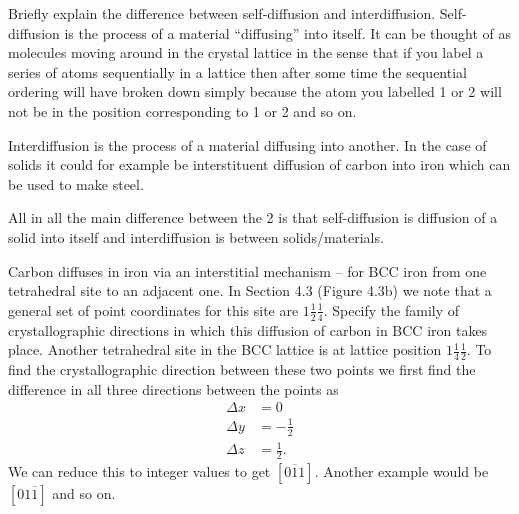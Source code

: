 
Briefly explain the difference between self-diffusion and interdiffusion.
\bigbreak
Self-diffusion is the process of a material ``diffusing'' into itself. It can be thought of as molecules moving around in the crystal lattice in the sense that if you label a series of atoms sequentially in a lattice then after some time the sequential ordering will have broken down simply because the atom you labelled 1 or 2 will not be in the position corresponding to 1 or 2 and so on.

Interdiffusion is the process of a material diffusing into another. In the case of solids it could for example be interstituent diffusion of carbon into iron which can be used to make steel.

All in all the main difference between the 2 is that self-diffusion is diffusion of a solid into itself and interdiffusion is between solids/materials.

Carbon diffuses in iron via an interstitial mechanism -- for BCC iron from one tetrahedral site to an adjacent one. In Section 4.3 (Figure 4.3b) we note that a general set of point coordinates for this site are $1 \frac{1}{2} \frac{1}{4}$. Specify the family of crystallographic directions in which this diffusion of carbon in BCC iron takes place.
\bigbreak
Another tetrahedral site in the BCC lattice is at lattice position $1 \frac{1}{4} \frac{1}{2}$. To find the crystallographic direction between these two points we first find the difference in all three directions between the points as
\begin{align*}
\Delta x &= 0 \\
\Delta y &= - \frac{1}{2} \\
\Delta z &= \frac{1}{2}
.\end{align*}
We can reduce this to integer values to get $[0 \overline{1} 1]$. Another example would be $[0 1 \overline{1}]$ and so on.

